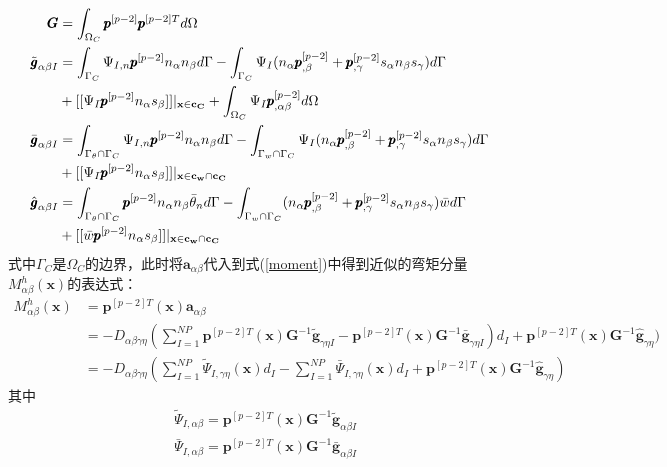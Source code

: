 \begin{subequations}
\begin{align}
\label{PG}\pmb{G}&=\int_{\Omega_C}\pmb{p}^{[p-2]}\pmb{p}^{[p-2]T}d\Omega\\
\label{Pg1}\tilde{\pmb g}_{\alpha\beta I}&=\int_{\Gamma_C}\Psi_{I,n}\pmb{p}^{[p-2]}n_{\alpha}n_{\beta}d\Gamma-\int_{\Gamma_C}\Psi_I(n_{\alpha}\pmb{p}^{[p-2]}_{,\beta}+\pmb{p}^{[p-2]}_{,\gamma}s_{\alpha}n_{\beta}s_{\gamma})d\Gamma \nonumber\\
&+[[\Psi_I\pmb{p}^{[p-2]}n_{\alpha}s_{\beta}]]\vert_{\bf{x}\in c_C}+\int_{\Omega_C}\Psi_I\pmb{p}^{[p-2]}_{,\alpha\beta}d\Omega\\
\label{Pg2}\bar{\pmb g}_{\alpha\beta I}&=\int_{{\Gamma_{\theta}}\cap{\Gamma_C}}\Psi_{I,n}\pmb{p}^{[p-2]}n_{\alpha}n_{\beta}d\Gamma-\int_{{\Gamma_w}\cap{\Gamma_C}}\Psi_I(n_{\alpha}\pmb{p}^{[p-2]}_{,\beta}+\pmb{p}^{[p-2]}_{,\gamma}s_{\alpha}n_{\beta}s_{\gamma})d\Gamma\nonumber\\
&+[[\Psi_I\pmb{p}^{[p-2]}n_{\alpha}s_{\beta}]]\vert_{\bf{x}\in{c_w}\cap{c_C}}\\
\label{Pg3}\hat{\pmb g}_{\alpha\beta I}&=\int_{{\Gamma_{\theta}}\cap{\Gamma_C}}\pmb{p}^{[p-2]}n_{\alpha}n_{\beta}\bar{\theta}_nd\Gamma-\int_{{\Gamma_w}\cap{\Gamma_C}}(n_{\alpha}\pmb{p}^{[p-2]}_{,\beta}+\pmb{p}^{[p-2]}_{,\gamma}s_{\alpha}n_{\beta}s_{\gamma})\bar{w}d\Gamma\nonumber\\
&+[[\bar{w}\pmb{p}^{[p-2]}n_{\alpha}s_{\beta}]]\vert_{\bf{x}\in{c_w}\cap{c_C}}
\end{align}
\end{subequations}
式中$\Gamma_C$是$\Omega_C$的边界，此时将$\pmb{a}_{\alpha\beta}$代入到式(\ref{moment})中得到近似的弯矩分量$M^h_{\alpha\beta}(\pmb{x})$的表达式：
\begin{equation}
\begin{split}
M^h_{\alpha\beta}(\pmb{x})&=\pmb{p}^{[p-2]T}(\pmb{x})\pmb a_{\alpha\beta}\\
&=-D_{\alpha\beta\gamma\eta}(\sum_{I=1}^{N\!P}\pmb{p}^{[p-2]T}(\pmb x)\pmb G^{-1}\tilde{\pmb g}_{\gamma\eta I}-\pmb{p}^{[p-2]T}(\pmb x)\pmb G^{-1}\bar{\pmb g}_{\gamma\eta I})d_I+\pmb{p}^{[p-2]T}(\pmb x)\pmb G^{-1}\hat{\pmb g}_{\gamma\eta})\\
&=-D_{\alpha\beta\gamma\eta}(\sum_{I=1}^{N\!P}\tilde{\Psi}_{I,\gamma\eta}(\pmb x)d_I-\sum_{I=1}^{N\!P}\bar{\Psi}_{I,\gamma\eta}(\pmb{x})d_I+\pmb{p}^{[p-2]T}(\pmb x)\pmb G^{-1}\hat{\pmb g}_{\gamma\eta})
\end{split}
\end{equation}
其中
\begin{align}
 \label{PTPSI}&\tilde{\Psi}_{I,\alpha\beta}=\pmb{p}^{[p-2]T}(\pmb x)\pmb G^{-1}\tilde{\pmb g}_{\alpha\beta I}\\
 \label{PBPSI}&\bar{\Psi}_{I,\alpha\beta}=\pmb{p}^{[p-2]T}(\pmb x)\pmb G^{-1}\bar{\pmb g}_{\alpha\beta I}
\end{align}\par

